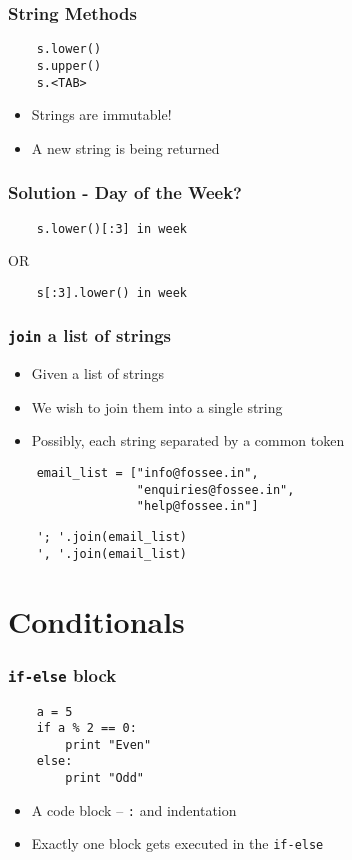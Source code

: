 \begin{frame}[fragile]
  \frametitle{String Methods} 
  \begin{lstlisting}
    s.lower()
    s.upper()
    s.<TAB>
  \end{lstlisting}
  \begin{itemize}
  \item \alert{Strings are immutable!}
  \item A new string is being returned
  \end{itemize}
\end{frame}

\begin{frame}[fragile]
  \frametitle{Solution - Day of the Week?}
  \begin{lstlisting}
    s.lower()[:3] in week
  \end{lstlisting}
  OR
  \begin{lstlisting}
    s[:3].lower() in week
  \end{lstlisting}
\end{frame}

\begin{frame}[fragile]
  \frametitle{\texttt{join} a list of strings}
  \begin{itemize}
  \item Given a list of strings
  \item We wish to join them into a single string
  \item Possibly, each string separated by a common token
  \end{itemize}
  \begin{lstlisting}
    email_list = ["info@fossee.in", 
                  "enquiries@fossee.in",
                  "help@fossee.in"]
  \end{lstlisting}
  \begin{lstlisting}
    '; '.join(email_list)
    ', '.join(email_list)
  \end{lstlisting}
\end{frame}

\section{Conditionals}

\begin{frame}[fragile]
  \frametitle{\texttt{if-else} block}
  \begin{lstlisting}
    a = 5
    if a % 2 == 0:
        print "Even"
    else:
        print "Odd"
  \end{lstlisting}
  \begin{itemize}
  \item A code block -- \texttt{:} and indentation
  \item Exactly one block gets executed in the \texttt{if-else}
  \end{itemize}
\end{frame}



